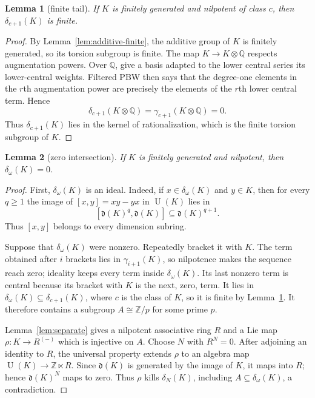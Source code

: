 \documentclass[10pt]{article}
\newtheorem{lemma}{Lemma}
\newcommand{\Z}{\mathbb Z}
\newcommand{\Q}{\mathbb Q}
\newcommand{\U}{\operatorname U}
\newcommand{\dlt}{\delta}
\newcommand{\gm}{\gamma}
\begin{document}
\begin{lemma}[finite tail]\label{lem:finite-tail}
If $K$ is finitely generated and nilpotent of class $c$, then
$\dlt_{c+1}(K)$ is finite.
\end{lemma}

\begin{proof}
By Lemma~\ref{lem:additive-finite}, the additive group of $K$ is finitely
generated, so its torsion subgroup is finite.  The map $K\to K\otimes\Q$
respects augmentation powers.  Over $\Q$, give a basis adapted to the lower
central series its lower-central weights.  Filtered PBW then says that the
degree-one elements in the $r$th augmentation power are precisely the
elements of the $r$th lower central term.  Hence
\[
 \dlt_{c+1}(K\otimes\Q)=\gm_{c+1}(K\otimes\Q)=0.
\]
Thus $\dlt_{c+1}(K)$ lies in the kernel of rationalization, which is the
finite torsion subgroup of $K$.
\end{proof}

\begin{lemma}[zero intersection]\label{lem:zero-intersection}
If $K$ is finitely generated and nilpotent, then $\dlt_\omega(K)=0$.
\end{lemma}

\begin{proof}
First, $\dlt_\omega(K)$ is an ideal.  Indeed, if
$x\in\dlt_\omega(K)$ and $y\in K$, then for every $q\ge1$ the image of
$[x,y]=xy-yx$ in $\U(K)$ lies in
\[
 [\mathfrak d(K)^q,\mathfrak d(K)]\subseteq\mathfrak d(K)^{q+1}.
\]
Thus $[x,y]$ belongs to every dimension subring.

Suppose that $\dlt_\omega(K)$ were nonzero.  Repeatedly bracket it with $K$.
The term obtained after $i$ brackets lies in $\gm_{i+1}(K)$, so nilpotence
makes the sequence reach zero; ideality keeps every term inside
$\dlt_\omega(K)$.  Its last nonzero term is central because its bracket with
$K$ is the next, zero, term.  It lies in
$\dlt_\omega(K)\subseteq\dlt_{c+1}(K)$, where $c$ is the class of $K$, so it
is finite by Lemma~\ref{lem:finite-tail}.  It therefore contains a subgroup
$A\cong\Z/p$ for some prime $p$.

Lemma~\ref{lem:separate} gives a nilpotent associative ring $R$ and a Lie
map $\rho:K\to R^{(-)}$ which is injective on $A$.  Choose $N$ with $R^N=0$.
After adjoining an identity to $R$, the universal property extends $\rho$ to
an algebra map $\U(K)\to\Z\ltimes R$.  Since $\mathfrak d(K)$ is generated
by the image of $K$, it maps into $R$; hence $\mathfrak d(K)^N$ maps to zero.
Thus $\rho$ kills $\dlt_N(K)$, including
$A\subseteq\dlt_\omega(K)$, a contradiction.
\end{proof}
\end{document}
